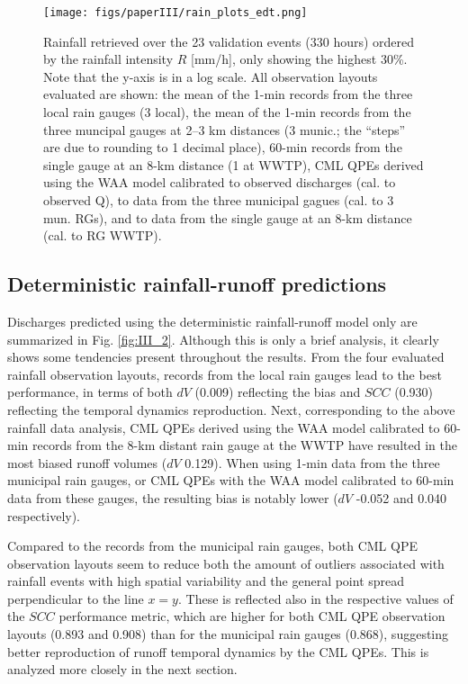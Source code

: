 \documentclass{ctuthesis}\usepackage[]{graphicx}\usepackage[]{color}
\begin{document}
\FloatBarrier

\begin{figure}[h]
\begin{center}
\texttt{[image: figs/paperIII/rain\_plots\_edt.png]}
\caption{Rainfall retrieved over the 23 validation events (330 hours) ordered by the rainfall intensity $R$ [mm/h], only showing the highest 30\%. Note that the y-axis is in a log scale. All observation layouts evaluated are shown: the mean of the 1-min records from the three local rain gauges (3 local), the mean of the 1-min records from the three muncipal gauges at 2–3 km distances (3 munic.; the \enquote{steps} are due to rounding to 1 decimal place), 60-min records from the single gauge at an 8-km distance (1 at WWTP), CML QPEs derived using the WAA model calibrated to observed discharges (cal. to observed Q), to data from the three municipal gagues (cal. to 3 mun. RGs), and to data from the single gauge at an 8-km distance (cal. to RG WWTP).} 
\label{fig:III_1}
\end{center}
\end{figure}




\FloatBarrier

\subsection{Deterministic rainfall-runoff predictions} \label{Scatter}

Discharges predicted using the deterministic rainfall-runoff model only are summarized in Fig. \ref{fig:III_2}. Although this is only a brief analysis, it clearly shows some tendencies present throughout the results. From the four evaluated rainfall observation layouts, records from the local rain gauges lead to the best performance, in terms of both $dV$ (0.009) reflecting the bias and $S\!C\!C$ (0.930) reflecting the temporal dynamics reproduction. Next, corresponding to the above rainfall data analysis, CML QPEs derived using the WAA model calibrated to 60-min records from the 8-km distant rain gauge at the WWTP have resulted in the most biased runoff volumes ($dV$ 0.129). When using 1-min data from the three municipal rain gauges, or CML QPEs with the WAA model calibrated to 60-min data from these gauges, the resulting bias is notably lower ($dV$ -0.052 and 0.040 respectively). 


Compared to the records from the municipal rain gauges, both CML QPE observation layouts seem to reduce both the amount of outliers associated with rainfall events with high spatial variability and the general point spread perpendicular to the line $x=y$. These is reflected also in the respective values of the $S\!C\!C$ performance metric, which are higher for both CML QPE observation layouts (0.893 and 0.908) than for the municipal rain gauges (0.868), suggesting better reproduction of runoff temporal dynamics by the CML QPEs. This is analyzed more closely in the next section. 
\end{document}

